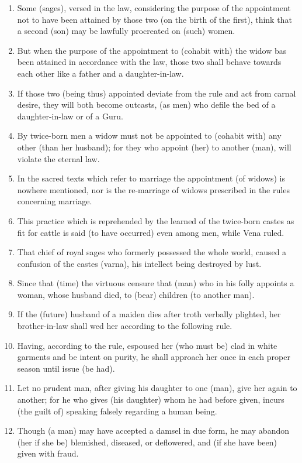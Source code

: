 \begin{enumerate}
\item Some (sages), versed in the law, considering the purpose of the appointment not to have been attained by those two (on the birth of the first), think that a second (son) may be lawfully procreated on (such) women.
\item But when the purpose of the appointment to (cohabit with) the widow bas been attained in accordance with the law, those two shall behave towards each other like a father and a daughter-in-law.
\item If those two (being thus) appointed deviate from the rule and act from carnal desire, they will both become outcasts, (as men) who defile the bed of a daughter-in-law or of a Guru.
\item By twice-born men a widow must not be appointed to (cohabit with) any other (than her husband); for they who appoint (her) to another (man), will violate the eternal law.
\item In the sacred texts which refer to marriage the appointment (of widows) is nowhere mentioned, nor is the re-marriage of widows prescribed in the rules concerning marriage.
\item This practice which is reprehended by the learned of the twice-born castes as fit for cattle is said (to have occurred) even among men, while Vena ruled.
\item That chief of royal sages who formerly possessed the whole world, caused a confusion of the castes (varna), his intellect being destroyed by lust.
\item Since that (time) the virtuous censure that (man) who in his folly appoints a woman, whose husband died, to (bear) children (to another man).
\item If the (future) husband of a maiden dies after troth verbally plighted, her brother-in-law shall wed her according to the following rule.
\item Having, according to the rule, espoused her (who must be) clad in white garments and be intent on purity, he shall approach her once in each proper season until issue (be had).
\item Let no prudent man, after giving his daughter to one (man), give her again to another; for he who gives (his daughter) whom he had before given, incurs (the guilt of) speaking falsely regarding a human being.
\item Though (a man) may have accepted a damsel in due form, he may abandon (her if she be) blemished, diseased, or deflowered, and (if she have been) given with fraud.

\end{enumerate}
